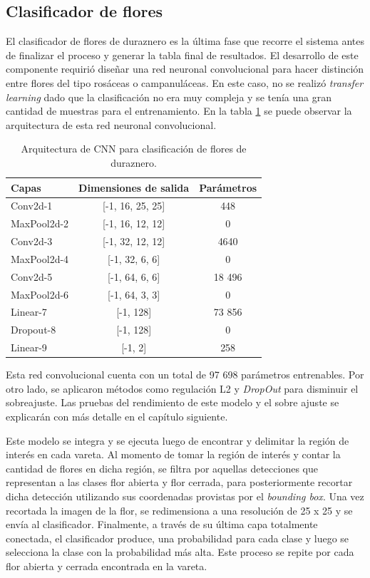 \subsection{Clasificador de flores}

El clasificador de flores de duraznero es la última fase que recorre el sistema antes de finalizar el proceso y generar la tabla final de resultados. El desarrollo de este componente requirió diseñar una red neuronal convolucional para hacer distinción entre flores del tipo rosáceas o campanuláceas. En este caso, no se realizó \textit{transfer learning} dado que la clasificación no era muy compleja y se tenía una gran cantidad de muestras para el entrenamiento. En la tabla \ref{tab:FlowerCNN} se puede observar la arquitectura de esta red neuronal convolucional.

\begin{table}[h]
	\centering
	\caption{Arquitectura de CNN para clasificación de flores de duraznero.}
	\begin{tabular}{l c c}    
		\toprule
		\textbf{Capas}     & \textbf{Dimensiones de salida} & \textbf{Parámetros} \\
		\midrule
		Conv2d-1          & [-1, 16, 25, 25] &  448\\
		MaxPool2d-2       & [-1, 16, 12, 12] & 0\\
		Conv2d-3          & [-1, 32, 12, 12] & 4640 \\
		MaxPool2d-4       & [-1, 32, 6, 6]   & 0 \\
		Conv2d-5          & [-1, 64, 6, 6]   & 18 496 \\
		MaxPool2d-6       & [-1, 64, 3, 3]   & 0 \\	
		Linear-7          & [-1, 128]        & 73 856 \\
		Dropout-8         & [-1, 128]        & 0 \\
		Linear-9          & [-1, 2]          & 258 \\	
		\bottomrule
		\hline
	\end{tabular}
	\label{tab:FlowerCNN}
\end{table}  

Esta red convolucional cuenta con un total de 97 698 parámetros entrenables. Por otro lado, se aplicaron métodos como regulación L2 \cite{WEBSITE:10} y \textit{DropOut} \cite{ARTICLE:21} para disminuir el sobreajuste. Las pruebas del rendimiento de este modelo y el sobre ajuste se explicarán con más detalle en el capítulo siguiente.

Este modelo se integra y se ejecuta luego de encontrar y delimitar la región de interés en cada vareta. Al momento de tomar la región de interés y contar la cantidad de flores en dicha región, se filtra por aquellas detecciones que representan a las clases flor abierta y flor cerrada, para posteriormente recortar dicha detección utilizando sus coordenadas provistas por el \textit{bounding box}. Una vez recortada la imagen de la flor, se redimensiona a una resolución de 25 x 25 y se envía al clasificador. Finalmente, a través de su última capa totalmente conectada, el clasificador produce, una probabilidad para cada clase y luego se selecciona la clase con la probabilidad más alta. Este proceso se repite por cada flor abierta y cerrada encontrada en la vareta. 

